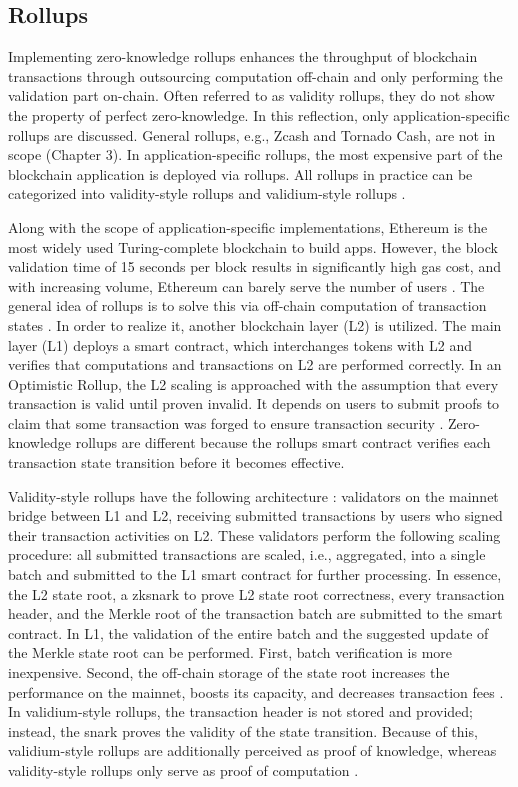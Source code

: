 \subsection{Rollups}
Implementing zero-knowledge rollups enhances the throughput of blockchain transactions through outsourcing computation off-chain and only performing the validation part on-chain. Often referred to as validity rollups, they do not show the property of perfect zero-knowledge. In this reflection, only application-specific rollups are discussed. General rollups, e.g., Zcash and Tornado Cash, are not in scope (Chapter 3). In application-specific rollups, the most expensive part of the blockchain application is deployed via rollups. All rollups in practice can be categorized into validity-style rollups and validium-style rollups \citep{chen2022review}.

Along with the scope of application-specific implementations, Ethereum is the most widely used Turing-complete blockchain to build apps. However, the block validation time of 15 seconds per block results in significantly high gas cost, and with increasing volume, Ethereum can barely serve the number of users \citep{scalingintro}. The general idea of rollups is to solve this via off-chain computation of transaction states \citep{chen2022review}. In order to realize it, another blockchain layer (L2) is utilized. The main layer (L1) deploys a smart contract, which interchanges tokens with L2 and verifies that computations and transactions on L2 are performed correctly. In an Optimistic Rollup, the L2 scaling is approached with the assumption that every transaction is valid until proven invalid. It depends on users to submit proofs to claim that some transaction was forged to ensure transaction security \citep{zksyncintro}. Zero-knowledge rollups are different because the rollups smart contract verifies each transaction state transition before it becomes effective. 

Validity-style rollups have the following architecture \citep{buterinrollups}: validators on the mainnet bridge between L1 and L2, receiving submitted transactions by users who signed their transaction activities on L2. These validators perform the following scaling procedure: all submitted transactions are scaled, i.e., aggregated, into a single batch and submitted to the L1 smart contract for further processing. In essence, the L2 state root, a \acrshort{zksnark} to prove L2 state root correctness, every transaction header, and the Merkle root of the transaction batch are submitted to the smart contract. In L1, the validation of the entire batch and the suggested update of the Merkle state root can be performed. First, batch verification is more inexpensive. Second, the off-chain storage of the state root increases the performance on the mainnet, boosts its capacity, and decreases transaction fees \citep{chen2022review}. In validium-style rollups, the transaction header is not stored and provided; instead, the \acrshort{snark} proves the validity of the state transition. Because of this, validium-style rollups are additionally perceived as proof of knowledge, whereas validity-style rollups only serve as proof of computation \citep{validiumintro}. 

